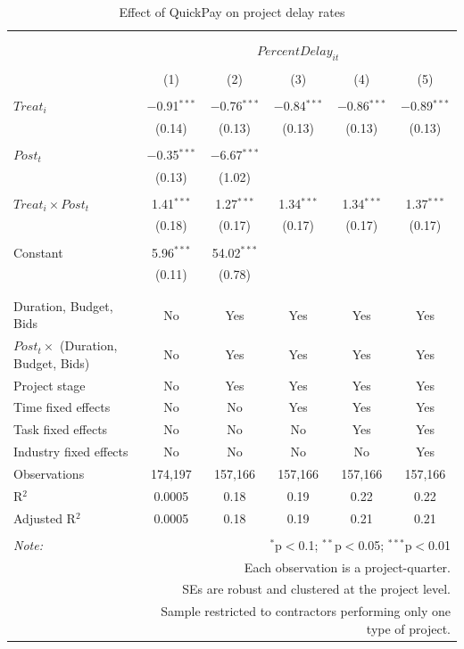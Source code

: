 \documentclass[
]{article}
\begin{document}
\begin{table}[H] \centering 
  \caption{Effect of QuickPay on project delay rates} 
  \label{} 
\small 
\begin{tabular}{@{\extracolsep{-2pt}}lccccc} 
\\[-1.8ex]\hline 
\hline \\[-1.8ex] 
\\[-1.8ex] & \multicolumn{5}{c}{$PercentDelay_{it}$} \\ 
\\[-1.8ex] & (1) & (2) & (3) & (4) & (5)\\ 
\hline \\[-1.8ex] 
 $Treat_i$ & $-$0.91$^{***}$ & $-$0.76$^{***}$ & $-$0.84$^{***}$ & $-$0.86$^{***}$ & $-$0.89$^{***}$ \\ 
  & (0.14) & (0.13) & (0.13) & (0.13) & (0.13) \\ 
  & & & & & \\ 
 $Post_t$ & $-$0.35$^{***}$ & $-$6.67$^{***}$ &  &  &  \\ 
  & (0.13) & (1.02) &  &  &  \\ 
  & & & & & \\ 
 $Treat_i \times Post_t$ & 1.41$^{***}$ & 1.27$^{***}$ & 1.34$^{***}$ & 1.34$^{***}$ & 1.37$^{***}$ \\ 
  & (0.18) & (0.17) & (0.17) & (0.17) & (0.17) \\ 
  & & & & & \\ 
 Constant & 5.96$^{***}$ & 54.02$^{***}$ &  &  &  \\ 
  & (0.11) & (0.78) &  &  &  \\ 
  & & & & & \\ 
\hline \\[-1.8ex] 
Duration, Budget, Bids & No & Yes & Yes & Yes & Yes \\ 
$Post_t \times$  (Duration, Budget, Bids) & No & Yes & Yes & Yes & Yes \\ 
Project stage & No & Yes & Yes & Yes & Yes \\ 
Time fixed effects & No & No & Yes & Yes & Yes \\ 
Task fixed effects & No & No & No & Yes & Yes \\ 
Industry fixed effects & No & No & No & No & Yes \\ 
Observations & 174,197 & 157,166 & 157,166 & 157,166 & 157,166 \\ 
R$^{2}$ & 0.0005 & 0.18 & 0.19 & 0.22 & 0.22 \\ 
Adjusted R$^{2}$ & 0.0005 & 0.18 & 0.19 & 0.21 & 0.21 \\ 
\hline 
\hline \\[-1.8ex] 
\textit{Note:}  & \multicolumn{5}{r}{$^{*}$p$<$0.1; $^{**}$p$<$0.05; $^{***}$p$<$0.01} \\ 
 & \multicolumn{5}{r}{Each observation is a project-quarter.} \\ 
 & \multicolumn{5}{r}{SEs are robust and clustered at the project level.} \\ 
 & \multicolumn{5}{r}{Sample restricted to contractors performing only one type of project.} \\ 
\end{tabular} 
\end{table}
\end{document}
